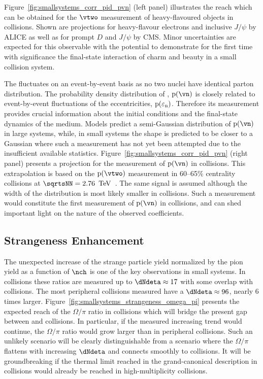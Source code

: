 \documentclass[../report.tex]{subfiles}
\begin{document}
Figure~\ref{fig:smallsystems_corr_pid_pvn} (left panel) illustrates the reach which can be obtained for the $\vtwo$ measurement of heavy-flavoured objects in \pPb collisions. Shown are projections for heavy-flavour electrons and inclusive $J/\psi$ by ALICE as well as for prompt $D$ and $J/\psi$ by CMS. Minor uncertainties are expected for this observable with the potential to demonstrate for the first time with significance the final-state interaction of charm and beauty in a small collision system.

The \vn fluctuates on an event-by-event basis as no two nuclei have identical parton distribution. The probability density distribution of \vn, ${\rm p}(\vn)$ is closely related to event-by-event fluctuations of the eccentricities, ${\rm p}(\varepsilon_{\rm{n}})$. Therefore its measurement provides crucial information about the initial conditions and the final-state dynamics of the medium. 
Models predict a semi-Gaussian distribution of ${\rm p}(\vn)$ in large systems, while, in small systems the shape is predicted to be closer to a Gaussian  where such a measurement has not yet been attempted due to the insufficient available statistics.
Figure~\ref{fig:smallsystems_corr_pid_pvn} (right panel) presents a projection for the measurement of ${\rm p}(\vn)$ in \pp collisions. This extrapolation is based on the ${\rm p}(\vtwo)$ measurement in 60--65\% centrality \PbPb collisions at $\sqrtsNN = \unit[2.76]{\UTeV}$~\cite{Aad:2013xma}. The same signal is assumed although the width of the distribution is most likely smaller in \pp collisions. Such a measurement would constitute the first measurement of ${\rm p}(\vn)$ in \pp collisions, and can shed important light on the nature of the observed \vtwo coefficients.


\subsection{Strangeness Enhancement}
\label{sect:smallsystems_strangeness}

The unexpected increase of the strange particle yield normalized by the pion yield as a function of $\nch$ is one of the key observations in small systems. In \pp collisions these ratios are measured up to $\dNdeta \approx 17$ with some overlap with \pPb collisions. The most peripheral \PbPb collisions measured have a $\dNdeta \approx 96$, nearly 6 times larger. Figure~\ref{fig:smallsystems_strangeness_omega_pi} presents the expected reach of the $\Omega/\pi$ ratio in \pp collisions which will bridge the present gap between \pp and \PbPb collisions. In particular, if the measured increasing trend would continue, the $\Omega/\pi$ ratio would grow larger than in peripheral \PbPb collisions. Such an unlikely scenario will be clearly distinguishable from a scenario where the $\Omega/\pi$ flattens with increasing $\dNdeta$ and connects smoothly to \PbPb collisions. It will be groundbreaking if the thermal limit reached in the grand-canonical description in \PbPb collisions would already be reached in high-multiplicity \pp collisions.
\end{document}
